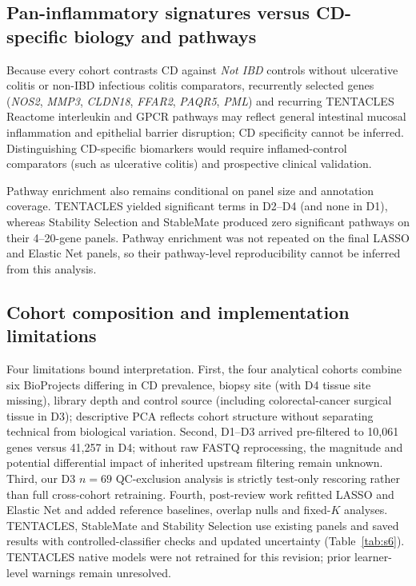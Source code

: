 \subsection{Pan-inflammatory signatures versus CD-specific biology and pathways}
\label{sec:discussion_pathway}
Because every cohort contrasts CD against \emph{Not IBD} controls without ulcerative colitis or non-IBD infectious colitis comparators, recurrently selected genes (\textit{NOS2}, \textit{MMP3}, \textit{CLDN18}, \textit{FFAR2}, \textit{PAQR5}, \textit{PML}) and recurring TENTACLES Reactome interleukin and GPCR pathways may reflect general intestinal mucosal inflammation and epithelial barrier disruption; CD specificity cannot be inferred. Distinguishing CD-specific biomarkers would require inflamed-control comparators (such as ulcerative colitis) and prospective clinical validation.

Pathway enrichment also remains conditional on panel size and annotation coverage. TENTACLES yielded significant terms in D2--D4 (and none in D1), whereas Stability Selection and StableMate produced zero significant pathways on their 4--20-gene panels. Pathway enrichment was not repeated on the final LASSO and Elastic Net panels, so their pathway-level reproducibility cannot be inferred from this analysis.

\subsection{Cohort composition and implementation limitations}
\label{sec:discussion_limits}
Four limitations bound interpretation. First, the four analytical cohorts combine six BioProjects differing in CD prevalence, biopsy site (with D4 tissue site missing), library depth and control source (including colorectal-cancer surgical tissue in D3); descriptive PCA reflects cohort structure without separating technical from biological variation. Second, D1--D3 arrived pre-filtered to 10,061 genes versus 41,257 in D4; without raw FASTQ reprocessing, the magnitude and potential differential impact of inherited upstream filtering remain unknown. Third, our D3 $n=69$ QC-exclusion analysis is strictly test-only rescoring rather than full cross-cohort retraining. Fourth, post-review work refitted LASSO and Elastic Net and added reference baselines, overlap nulls and fixed-$K$ analyses. TENTACLES, StableMate and Stability Selection use existing panels and saved results with controlled-classifier checks and updated uncertainty (Table~\ref{tab:s6}). TENTACLES native models were not retrained for this revision; prior learner-level warnings remain unresolved.

